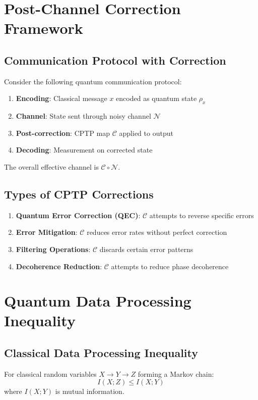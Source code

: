 \documentclass[12pt]{article}
\begin{document}
\section{Post-Channel Correction Framework}

\subsection{Communication Protocol with Correction}
Consider the following quantum communication protocol:
\begin{enumerate}
    \item \textbf{Encoding}: Classical message $x$ encoded as quantum state $\rho_x$
    \item \textbf{Channel}: State sent through noisy channel $\mathcal{N}$
    \item \textbf{Post-correction}: CPTP map $\mathcal{C}$ applied to output
    \item \textbf{Decoding}: Measurement on corrected state
\end{enumerate}

The overall effective channel is $\mathcal{C} \circ \mathcal{N}$.

\subsection{Types of CPTP Corrections}
\begin{enumerate}
    \item \textbf{Quantum Error Correction (QEC)}: $\mathcal{C}$ attempts to reverse specific errors
    \item \textbf{Error Mitigation}: $\mathcal{C}$ reduces error rates without perfect correction
    \item \textbf{Filtering Operations}: $\mathcal{C}$ discards certain error patterns
    \item \textbf{Decoherence Reduction}: $\mathcal{C}$ attempts to reduce phase decoherence
\end{enumerate}

\section{Quantum Data Processing Inequality}

\subsection{Classical Data Processing Inequality}
For classical random variables $X \to Y \to Z$ forming a Markov chain:
\[
I(X;Z) \leq I(X;Y)
\]
where $I(X;Y)$ is mutual information.
\end{document}
